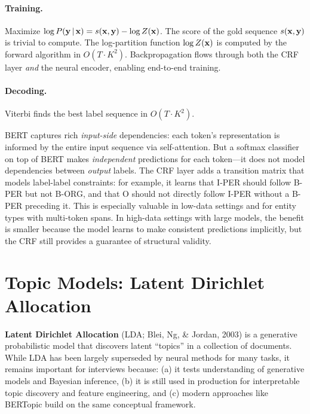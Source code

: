 \paragraph{Training.}  Maximize $\log P(\mathbf{y} \,|\, \mathbf{x}) = s(\mathbf{x}, \mathbf{y}) - \log Z(\mathbf{x})$.
The score of the gold sequence $s(\mathbf{x}, \mathbf{y})$ is trivial to compute.  The
log-partition function $\log Z(\mathbf{x})$ is computed by the forward algorithm in
$O(T \cdot K^2)$.  Backpropagation flows through both the CRF layer \emph{and}
the neural encoder, enabling end-to-end training.

\paragraph{Decoding.}  Viterbi finds the best label sequence in $O(T \cdot K^2)$.

\begin{keyinsight}
BERT captures rich \emph{input-side} dependencies: each token's representation
is informed by the entire input sequence via self-attention.  But a softmax
classifier on top of BERT makes \emph{independent} predictions for each
token---it does not model dependencies between \emph{output} labels.  The CRF
layer adds a transition matrix that models label-label constraints: for
example, it learns that I-PER should follow B-PER but not B-ORG, and that
O should not directly follow I-PER without a B-PER preceding it.  This is
especially valuable in low-data settings and for entity types with multi-token
spans.  In high-data settings with large models, the benefit is smaller
because the model learns to make consistent predictions implicitly, but the
CRF still provides a guarantee of structural validity.
\end{keyinsight}


\section{Topic Models: Latent Dirichlet Allocation}
\label{sec:topic_models}

\textbf{Latent Dirichlet Allocation} (LDA; Blei, Ng, \& Jordan, 2003) is
a generative probabilistic model that discovers latent ``topics'' in a
collection of documents.  While LDA has been largely superseded by neural
methods for many tasks, it remains important for interviews because:
(a) it tests understanding of generative models and Bayesian inference,
(b) it is still used in production for interpretable topic discovery and
feature engineering, and (c) modern approaches like BERTopic build on the
same conceptual framework.

